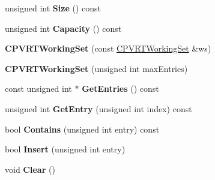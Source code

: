 \begin{DoxyCompactItemize}
\item 
\hypertarget{class_c_p_v_r_t_working_set_a9675c980ecaaea772566b87912ce8970}{unsigned int {\bfseries Size} () const }\label{class_c_p_v_r_t_working_set_a9675c980ecaaea772566b87912ce8970}

\item 
\hypertarget{class_c_p_v_r_t_working_set_afc8639149762c35f197a9b046a7531d4}{unsigned int {\bfseries Capacity} () const }\label{class_c_p_v_r_t_working_set_afc8639149762c35f197a9b046a7531d4}

\item 
\hypertarget{class_c_p_v_r_t_working_set_acc5d10f16902c6ceb1120befe15cfa8f}{{\bfseries C\+P\+V\+R\+T\+Working\+Set} (const \hyperlink{class_c_p_v_r_t_working_set}{C\+P\+V\+R\+T\+Working\+Set} \&ws)}\label{class_c_p_v_r_t_working_set_acc5d10f16902c6ceb1120befe15cfa8f}

\item 
\hypertarget{class_c_p_v_r_t_working_set_aeab114a06ca2dfe1e912904fde1a3849}{{\bfseries C\+P\+V\+R\+T\+Working\+Set} (unsigned int max\+Entries)}\label{class_c_p_v_r_t_working_set_aeab114a06ca2dfe1e912904fde1a3849}

\item 
\hypertarget{class_c_p_v_r_t_working_set_a011faa4c0c71ca4ffc7571d41c544614}{const unsigned int $\ast$ {\bfseries Get\+Entries} () const }\label{class_c_p_v_r_t_working_set_a011faa4c0c71ca4ffc7571d41c544614}

\item 
\hypertarget{class_c_p_v_r_t_working_set_acca3949e031b08108e161b3e8bf13e81}{unsigned int {\bfseries Get\+Entry} (unsigned int index) const }\label{class_c_p_v_r_t_working_set_acca3949e031b08108e161b3e8bf13e81}

\item 
\hypertarget{class_c_p_v_r_t_working_set_a94abd2835b3fd681c27b242488303451}{bool {\bfseries Contains} (unsigned int entry) const }\label{class_c_p_v_r_t_working_set_a94abd2835b3fd681c27b242488303451}

\item 
\hypertarget{class_c_p_v_r_t_working_set_ae88d3502e657c02c2a9e284a90198c48}{bool {\bfseries Insert} (unsigned int entry)}\label{class_c_p_v_r_t_working_set_ae88d3502e657c02c2a9e284a90198c48}

\item 
\hypertarget{class_c_p_v_r_t_working_set_ae86c00fa370f5de4072a61b8f65e6fad}{void {\bfseries Clear} ()}\label{class_c_p_v_r_t_working_set_ae86c00fa370f5de4072a61b8f65e6fad}


\end{DoxyCompactItemize}
